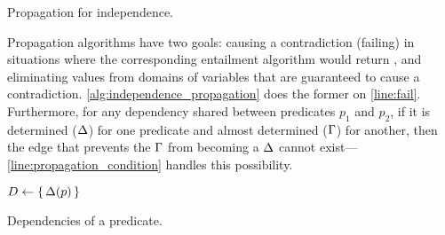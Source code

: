 \begin{algorithm}[t]
  \LinesNumbered
  \caption{Propagation for independence.}\label{alg:independence_propagation}
\end{algorithm}

Propagation algorithms have two goals: causing a contradiction (failing) in
situations where the corresponding entailment algorithm would return \false{},
and eliminating values from domains of variables that are guaranteed to cause a
contradiction. \cref{alg:independence_propagation} does the former on
\cref{line:fail}. Furthermore, for any dependency shared between predicates
$p_1$ and $p_2$, if it is determined ($\operatorname{\Delta}$) for one predicate and
almost determined ($\operatorname{\Gamma}$) for another, then the edge that prevents
the $\operatorname{\Gamma}$ from becoming a $\operatorname{\Delta}$ cannot
exist---\cref{line:propagation_condition} handles this possibility.

\begin{algorithm}[t]
   {
    $D \gets \{\, \operatorname{\Delta}(p) \,\}$\;
  }
  \caption{Dependencies of a predicate.}\label{alg:dependencies}
\end{algorithm}

